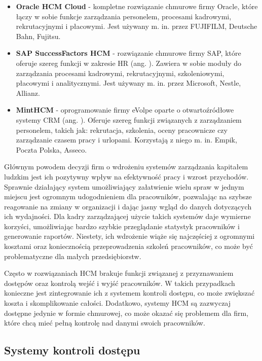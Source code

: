 \begin{itemize}
    \item \textbf{Oracle HCM Cloud}\cite{bib:OracleHCM} - kompletne rozwiązanie chmurowe firmy Oracle, które łączy w sobie funkcje zarządzania personelem, procesami kadrowymi, rekrutacyjnymi i płacowymi. Jest używany m. in. przez FUJIFILM, Deutsche Bahn, Fujitsu.
    \item \textbf{SAP SuccessFactors HCM}\cite{bib:SAPHCM} - rozwiązanie chmurowe firmy SAP, które oferuje szereg funkcji w zakresie HR (ang. ). Zawiera w sobie moduły do zarządzania procesami kadrowymi, rekrutacyjnymi, szkoleniowymi, płacowymi i analitycznymi. Jest używany m. in. przez Microsoft, Nestle, Allianz.
    \item \textbf{MintHCM}\cite{bib:MintHCM} - oprogramowanie firmy eVolpe oparte o otwartoźródłowe systemy CRM (ang. ). Oferuje szereg funkcji związanych z zarządzaniem personelem, takich jak: rekrutacja, szkolenia, oceny pracownicze czy zarządzanie czasem pracy i urlopami.  Korzystają z niego m. in. Empik, Poczta Polska, Asseco.
\end{itemize}

Głównym powodem decyzji firm o wdrożeniu systemów zarządzania kapitałem ludzkim jest ich pozytywny wpływ na efektywność pracy i wzrost przychodów. Sprawnie działający system umożliwiający załatwienie wielu spraw w jednym miejscu jest ogromnym udogodnieniem dla pracowników, pozwalając na szybsze reagowanie na zmiany w organizacji i dając jasny wgląd do danych dotyczących ich wydajności. Dla kadry zarządzającej użycie takich systemów daje wymierne korzyści, umożliwiając bardzo szybkie przeglądanie statystyk pracowników i generowanie raportów. Niestety, ich wdrożenie wiąże się najczęściej z ogromnymi kosztami oraz koniecznością przeprowadzenia szkoleń pracowników, co może być problematyczne dla małych przedsiębiorstw.

Często w rozwiązaniach HCM brakuje funkcji związanej z przyznawaniem dostępów oraz kontrolą wejść i wyjść pracowników. W takich przypadkach konieczne jest zintegrowanie ich z systemem kontroli dostępu, co może zwiększać koszta i skomplikowanie całości. Dodatkowo, systemy HCM są zazwyczaj dostępne jedynie w formie chmurowej, co może okazać się problemem dla firm, które chcą mieć pełną kontrolę nad danymi swoich pracowników.

\subsection{Systemy kontroli dostępu}

